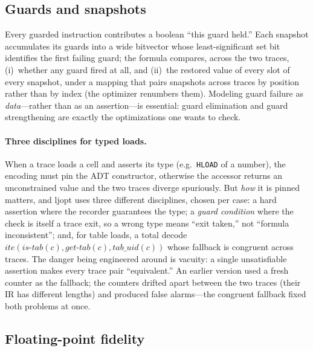 \documentclass[runningheads]{llncs}
\newif\iffull \fulltrue
\newcommand{\ljopt}{\textsf{ljopt}}
\newcommand{\ir}[1]{\texttt{#1}}
\begin{document}
\subsection{Guards and snapshots}

Every guarded instruction contributes a boolean ``this guard held.'' Each
snapshot accumulates its guards into a wide bitvector whose least-significant
set bit identifies the first failing guard; the formula compares, across the
two traces, (i)~whether any guard fired at all, and (ii)~the restored value
of every slot of every snapshot, under a mapping that pairs snapshots across
traces by position rather than by index (the optimizer renumbers them).
Modeling guard failure as \emph{data}---rather than as an assertion---is
essential: guard elimination and guard strengthening are exactly the
optimizations one wants to check.

\iffull
\paragraph{Three disciplines for typed loads.}
When a trace loads a cell and asserts its type (e.g.\ \ir{HLOAD} of a
number), the encoding must pin the ADT constructor, otherwise the accessor
returns an unconstrained value and the two traces diverge spuriously. But
\emph{how} it is pinned matters, and \ljopt{} uses three different
disciplines, chosen per case:
a hard assertion where the recorder guarantees the type;
a \emph{guard condition} where the check is itself a trace exit, so a wrong
type means ``exit taken,'' not ``formula inconsistent'';
and, for table loads, a total decode
$\mathit{ite}(\mathit{is\mbox{-}tab}(c),\allowbreak \mathit{get\mbox{-}tab}(c),\allowbreak \mathit{tab\_uid}(c))$
whose fallback is congruent across traces.
The danger being engineered around is vacuity: a single unsatisfiable
assertion makes every trace pair ``equivalent.'' An earlier version used a
fresh counter as the fallback; the counters drifted apart between the two
traces (their IR has different lengths) and produced false alarms---the
congruent fallback fixed both problems at once.
\fi %

\subsection{Floating-point fidelity}
\end{document}
